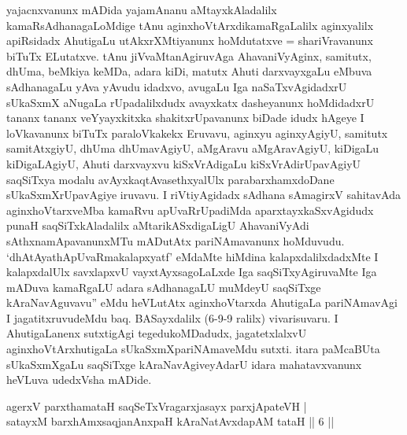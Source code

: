 


\begin{artha}
yajacnxvanunx mADida yajamAnanu aMtayxkAladalilx kamaRsAdhanagaLoMdige tAnu aginxhoVtArxdikamaRgaLalilx aginxyalilx apiRsidadx AhutigaLu utAkxrXMtiyanunx hoMdutatxve = shariVravanunx biTuTx ELutatxve. tAnu jiVvaMtanAgiruvAga AhavaniVyAginx, samitutx, dhUma, beMkiya keMDa, adara kiDi, matutx Ahuti darxvayxgaLu eMbuva sAdhanagaLu yAva yAvudu idadxvo, avugaLu Iga naSaTxvAgidadxrU sUkaSxmX aNugaLa rUpadalilxdudx avayxkatx dasheyanunx hoMdidadxrU tananx tananx veYyayxkitxka shakitxrUpavanunx biDade idudx hAgeye I loVkavanunx biTuTx paraloVkakekx Eruvavu, aginxyu aginxyAgiyU, samitutx samitAtxgiyU, dhUma dhUmavAgiyU, aMgAravu aMgAravAgiyU, kiDigaLu kiDigaLAgiyU, Ahuti darxvayxvu kiSxVrAdigaLu kiSxVrAdirUpavAgiyU saqSiTxya modalu avAyxkaqtAvasethxyalUlx parabarxhamxdoDane sUkaSxmXrUpavAgiye iruvavu. I riVtiyAgidadx sAdhana sAmagirxV sahitavAda aginxhoVtarxveMba kamaRvu apUvaRrUpadiMda aparxtayxkaSxvAgidudx punaH saqSiTxkAladalilx aMtarikASxdigaLigU AhavaniVyAdi sAthxnamApavanunxMTu mADutAtx pariNAmavanunx hoMduvudu. `dhAtAyathApUvaRmakalapxyatf' eMdaMte hiMdina kalapxdalilxdadxMte I kalapxdalUlx savxlapxvU vayxtAyxsagoLaLxde Iga saqSiTxyAgiruvaMte Iga mADuva kamaRgaLU adara sAdhanagaLU muMdeyU saqSiTxge kAraNavAguvavu'' eMdu heVLutAtx aginxhoVtarxda AhutigaLa pariNAmavAgi I jagatitxruvudeMdu baq. BASayxdalilx (6-9-9 ralilx) vivarisuvaru. I AhutigaLanenx sutxtigAgi tegedukoMDadudx, jagatetxlalxvU aginxhoVtArxhutigaLa sUkaSxmXpariNAmaveMdu sutxti. itara paMcaBUta sUkaSxmXgaLu saqSiTxge kAraNavAgiveyAdarU idara mahatavxvanunx heVLuva udedxVsha mADide.
\end{artha}

\begin{shl}
agerxV parxthamataH saqSeTxVragarxjasayx parxjApateVH | \\
satayxM barxhAmxsaqjanAnxpaH kAraNatAvxdapAM tataH \hfill ||  6 || 
\end{shl}

